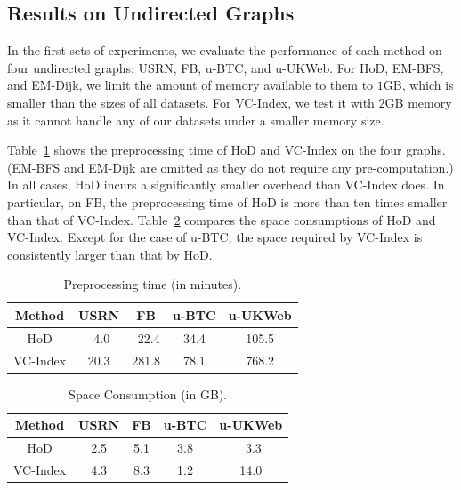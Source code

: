 \documentclass{sig-alternate}
\def\tblcapup{\vspace{-0mm}}
\def\tblcapdown{\vspace{-3mm}}
\def\tblup{\vspace{2mm}}
\begin{document}
\begin{sloppy}
\subsection{Results on Undirected Graphs} \label{sec:exp-undirected}

In the first sets of experiments, we evaluate the performance of each method on four undirected graphs: USRN, FB, u-BTC, and u-UKWeb. For HoD, EM-BFS, and EM-Dijk, we limit the amount of memory available to them to $1$GB, which is smaller than the sizes of all datasets. For VC-Index, we test it with $2$GB memory as it cannot handle any of our datasets under a smaller memory size.

Table~\ref{tbl:exp-pre} shows the preprocessing time of HoD and VC-Index on the four graphs. (EM-BFS and EM-Dijk are omitted as they do not require any pre-computation.) In all cases, HoD incurs a significantly smaller overhead than VC-Index does. In particular, on FB, the preprocessing time of HoD is more than ten times smaller than that of VC-Index. Table~\ref{tbl:exp-space} compares the space consumptions of HoD and VC-Index. Except for the case of u-BTC, the space required by VC-Index is consistently larger than that by HoD.

\begin{table}[t]
\centering
\vspace{-2mm}
\begin{small}
\caption{Preprocessing time (in minutes).}
\label{tbl:exp-pre}
\tblup
\begin{tabular}{|c|c|c|c|c|}
\hline
{\bf Method} &   {\bf USRN} & {\bf FB} &  {\bf u-BTC} & {\bf u-UKWeb} \\  \hline
HoD & $\;\,$4.0 & $\;\,$22.4 & 34.4 & 105.5 \\ \hline
VC-Index & 20.3 & 281.8 & 78.1 & 768.2 \\ \hline
\end{tabular}
\tblcapdown
\end{small}
\end{table}

\begin{table}[t]
\centering
\begin{small}
\caption{Space Consumption (in GB).}
\label{tbl:exp-space}
\tblup
\begin{tabular}{|c|c|c|c|c|}
\hline
{\bf Method} &   {\bf USRN} & {\bf FB} &  {\bf u-BTC} & {\bf u-UKWeb} \\  \hline
HoD & 2.5 & 5.1 & 3.8 & $\;\,$3.3 \\ \hline
VC-Index & 4.3 & 8.3 & 1.2 & 14.0 \\ \hline
\end{tabular}
\tblcapdown
\end{small}
\end{table}


\end{sloppy}
\end{document}
